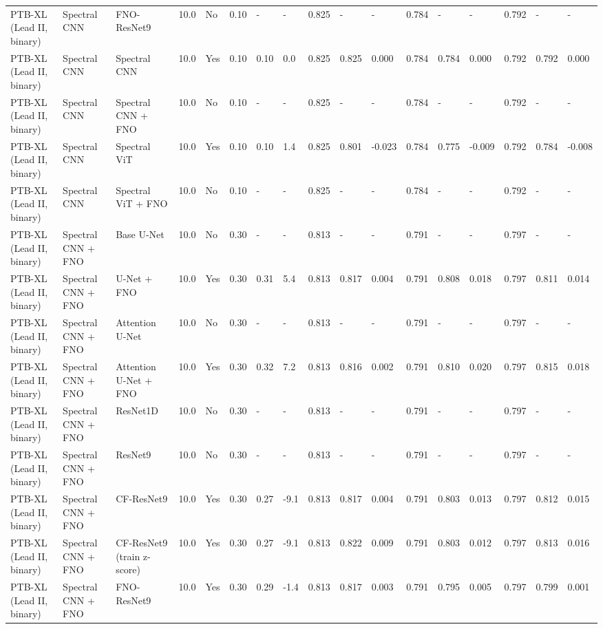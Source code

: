 \begin{longtable}{lllllllllllllllll}
PTB-XL (Lead II, binary) & Spectral CNN & FNO-ResNet9 & 10.0 & No & 0.10 & - & - & 0.825 & - & - & 0.784 & - & - & 0.792 & - & - \\
PTB-XL (Lead II, binary) & Spectral CNN & Spectral CNN & 10.0 & Yes & 0.10 & 0.10 & 0.0 & 0.825 & 0.825 & 0.000 & 0.784 & 0.784 & 0.000 & 0.792 & 0.792 & 0.000 \\
PTB-XL (Lead II, binary) & Spectral CNN & Spectral CNN + FNO & 10.0 & No & 0.10 & - & - & 0.825 & - & - & 0.784 & - & - & 0.792 & - & - \\
PTB-XL (Lead II, binary) & Spectral CNN & Spectral ViT & 10.0 & Yes & 0.10 & 0.10 & 1.4 & 0.825 & 0.801 & -0.023 & 0.784 & 0.775 & -0.009 & 0.792 & 0.784 & -0.008 \\
PTB-XL (Lead II, binary) & Spectral CNN & Spectral ViT + FNO & 10.0 & No & 0.10 & - & - & 0.825 & - & - & 0.784 & - & - & 0.792 & - & - \\
PTB-XL (Lead II, binary) & Spectral CNN + FNO & Base U-Net & 10.0 & No & 0.30 & - & - & 0.813 & - & - & 0.791 & - & - & 0.797 & - & - \\
PTB-XL (Lead II, binary) & Spectral CNN + FNO & U-Net + FNO & 10.0 & Yes & 0.30 & 0.31 & 5.4 & 0.813 & 0.817 & 0.004 & 0.791 & 0.808 & 0.018 & 0.797 & 0.811 & 0.014 \\
PTB-XL (Lead II, binary) & Spectral CNN + FNO & Attention U-Net & 10.0 & No & 0.30 & - & - & 0.813 & - & - & 0.791 & - & - & 0.797 & - & - \\
PTB-XL (Lead II, binary) & Spectral CNN + FNO & Attention U-Net + FNO & 10.0 & Yes & 0.30 & 0.32 & 7.2 & 0.813 & 0.816 & 0.002 & 0.791 & 0.810 & 0.020 & 0.797 & 0.815 & 0.018 \\
PTB-XL (Lead II, binary) & Spectral CNN + FNO & ResNet1D & 10.0 & No & 0.30 & - & - & 0.813 & - & - & 0.791 & - & - & 0.797 & - & - \\
PTB-XL (Lead II, binary) & Spectral CNN + FNO & ResNet9 & 10.0 & No & 0.30 & - & - & 0.813 & - & - & 0.791 & - & - & 0.797 & - & - \\
PTB-XL (Lead II, binary) & Spectral CNN + FNO & CF-ResNet9 & 10.0 & Yes & 0.30 & 0.27 & -9.1 & 0.813 & 0.817 & 0.004 & 0.791 & 0.803 & 0.013 & 0.797 & 0.812 & 0.015 \\
PTB-XL (Lead II, binary) & Spectral CNN + FNO & CF-ResNet9 (train z-score) & 10.0 & Yes & 0.30 & 0.27 & -9.1 & 0.813 & 0.822 & 0.009 & 0.791 & 0.803 & 0.012 & 0.797 & 0.813 & 0.016 \\
PTB-XL (Lead II, binary) & Spectral CNN + FNO & FNO-ResNet9 & 10.0 & Yes & 0.30 & 0.29 & -1.4 & 0.813 & 0.817 & 0.003 & 0.791 & 0.795 & 0.005 & 0.797 & 0.799 & 0.001 \\

\end{longtable}
